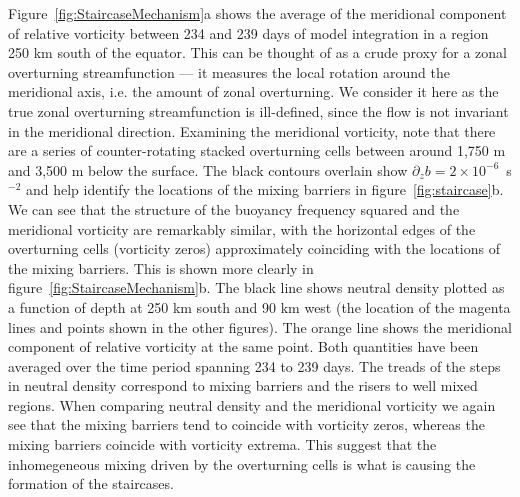 Figure~\ref{fig:StaircaseMechanism}a shows the average of the meridional component of relative vorticity between 234 and 239  days of model integration in a region 250 km south of the equator. This can be thought of as a crude proxy for a zonal overturning streamfunction --- it measures the local rotation around the meridional axis, i.e. the amount of zonal overturning. We consider it here as the true zonal overturning streamfunction is ill-defined, since the flow is not invariant in the meridional direction. Examining the meridional vorticity, note that there are a series of counter-rotating stacked overturning cells between around 1,750 m and 3,500 m below the surface. The black contours overlain show $\partial_z b = 2 \times 10^{-6}$~s$^{-2}$ and help identify the locations of the mixing barriers in figure~\ref{fig:staircase}b. We can see that the structure of the buoyancy frequency squared and the meridional vorticity are remarkably similar, with the horizontal edges of the overturning cells (vorticity zeros) approximately coinciding with the locations of the mixing barriers. This is shown more clearly in figure~\ref{fig:StaircaseMechanism}b. The black line shows neutral density plotted as a function of  depth at 250 km south and 90 km west (the location of the magenta lines and points shown in the other  figures). The orange line shows the meridional component of relative vorticity at the same point. Both quantities  have  been averaged over the time period spanning 234 to 239 days. The treads of the steps in neutral density correspond to mixing barriers and the risers to well mixed regions. When comparing neutral density and the meridional vorticity we again see that the mixing barriers tend to coincide with vorticity zeros, whereas the mixing barriers coincide with vorticity extrema. This suggest that the inhomegeneous mixing driven by the overturning cells is what is causing the formation of the staircases.

